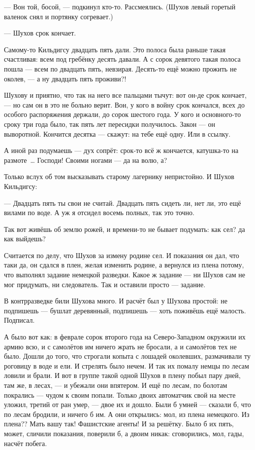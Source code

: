 --- Вон той, босой, --- подкинул кто-то. Рассмеялись. (Шухов левый горетый валенок снял и 
портянку согревает.)

--- Шухов срок кончает.

Самому-то Кильдигсу двадцать пять дали. Это полоса была раньше такая счастливая: всем под 
гребёнку десять давали. А с сорок девятого такая полоса пошла --- всем по двадцать пять, 
невзирая. Десять-то ещё можно прожить не околев, --- а ну двадцать пять проживи?!

Шухову и приятно, что так на него все пальцами тычут: вот он-де срок кончает, --- но сам он в это 
не больно верит. Вон, у кого в войну срок кончался, всех до особого распоряжения держали, до 
сорок шестого года. У кого и основного-то сроку три года было, так пять лет пересидки 
получилось. Закон --- он выворотной. Кончится десятка --- скажут: на тебе ещё одну. Или в ссылку.

А иной раз подумаешь --- дух сопрёт: срок-то всё ж кончается, катушка-то на размоте~\dots{} 
Господи! Своими ногами --- да на волю, а?

Только вслух об том высказывать старому лагернику непристойно. И Шухов Кильдигсу:

--- Двадцать пять ты свои не считай. Двадцать пять сидеть ли, нет ли, это ещё вилами по воде. А 
уж я отсидел восемь полных, так это точно.

Так вот живёшь об землю рожей, и времени-то не бывает подумать: как сел? да как выйдешь?

Считается по делу, что Шухов за измену родине сел. И показания он дал, что таки да, он сдался в 
плен, желая изменить родине, а вернулся из плена потому, что выполнял задание немецкой 
разведки. Какое ж задание --- ни Шухов сам не мог придумать, ни следователь. Так и оставили 
просто --- задание.

В контрразведке били Шухова много. И расчёт был у Шухова простой: не подпишешь --- бушлат 
деревянный, подпишешь --- хоть поживёшь ещё малость. Подписал.

А было вот как: в феврале сорок второго года на Северо-Западном окружили их армию всю, и с 
самолётов им ничего жрать не бросали, а и самолётов тех не было. Дошли до того, что строгали 
копыта с лошадей околевших, размачивали ту роговицу в воде и ели. И стрелять было нечем. И так 
их помалу немцы по лесам ловили и брали. И вот в группе такой одной Шухов в плену побыл пару 
дней, там же, в лесах, --- и убежали они впятером. И ещё по лесам, по болотам покрались --- чудом к 
своим попали. Только двоих автоматчик свой на месте уложил, третий от ран умер, --- двое их и 
дошло. Были б умней --- сказали б, что по лесам бродили, и ничего б им. А они открылись: мол, из 
плена немецкого. Из плена?? Мать вашу так! Фашистские агенты! И за решётку. Было б их пять, 
может, сличили показания, поверили б, а двоим никак: сговорились, мол, гады, насчёт побега.

